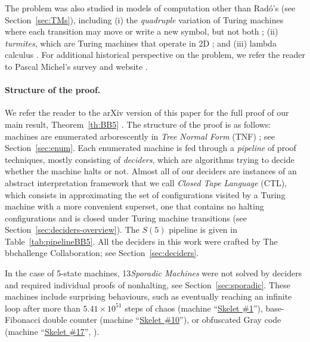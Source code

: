 \documentclass[sigconf,screen]{acmart}
\theoremstyle{definition} %
\numberwithin{equation}{section}
\theoremstyle{definition} %
\newcommand{\rado}{Rad\'o\xspace}
\newcommand{\numSporadic}{13\xspace}
\begin{document}
The \BBfull problem was also studied in models of computation other than \rado's (see Section~\ref{sec:TMs}), including (i) the \textit{quadruple} variation of Turing machines where each transition may move or write a new symbol, but not both \cite{Ross2003,Ross2005}; (ii) \textit{turmites}, which are Turing machines that operate in 2D \cite{BradyMeaningOfLife}; and (iii) lambda calculus \cite{tromp_oeis}. For additional historical perspective on the \BBfull problem, we refer the reader to Pascal Michel's survey and website \cite{michel2019busy,PMichel_website}.

\paragraph{Structure of the proof.} We refer the reader to the arXiv version of this paper for the full proof of our main result, Theorem~\ref{th:BB5} \cite{BB5}. The structure of the proof is as follows: machines are enumerated arborescently in \textit{Tree Normal Form} (TNF) \cite{Brady64}; see Section~\ref{sec:enum}. Each enumerated machine is fed through a \textit{pipeline} of proof techniques, mostly consisting of \textit{deciders}, which are algorithms trying to decide whether the machine halts or not. Almost all of our deciders are instances of an abstract interpretation framework that we call \textit{Closed Tape Language} (CTL), which consists in approximating the set of configurations visited by a Turing machine with a more convenient superset, one that contains no halting configurations and is closed under Turing machine transitions (see Section~\ref{sec:deciders-overview}). The $S(5)$ pipeline is given in Table~\ref{tab:pipelineBB5}. All the deciders in this work were crafted by The bbchallenge Collaboration; see Section~\ref{sec:deciders}.

In the case of 5-state machines, \numSporadic \textit{Sporadic Machines} were not solved by deciders and required individual proofs of nonhalting, see Section~\ref{sec:sporadic}. These machines include surprising behaviours, such as eventually reaching an infinite loop after more than $5.41\times10^{51}$ steps of chaos (machine ``\href{https://bbchallenge.org/1RB1RD_1LC0RC_1RA1LD_0RE0LB_---1RC}{Skelet \#1}''), base-Fibonacci double counter (machine ``\href{https://bbchallenge.org/1RB0RA_0LC1RA_1RE1LD_1LC0LD_---0RB}{Skelet \#10}''), or obfuscated Gray code (machine ``\href{https://bbchallenge.org/1RB---_0LC1RE_0LD1LC_1RA1LB_0RB0RA}{Skelet \#17}'', \cite{xu2024skelet17fifthbusy}).
\end{document}
